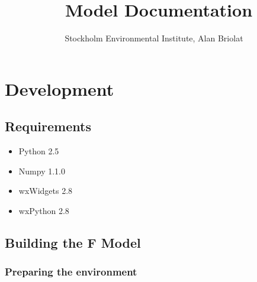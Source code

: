 \documentclass[10pt,a4paper]{article}
\title{\dose\ Model Documentation}
\author{Stockholm Environmental Institute, Alan Briolat}
\date{}
\begin{document}
\maketitle

\section{Development}

\subsection{Requirements}

\begin{itemize}
\item Python 2.5
\item Numpy 1.1.0
\item wxWidgets 2.8
\item wxPython 2.8
\end{itemize}

\subsection{Building the F Model}

\subsubsection*{Preparing the environment}
\end{document}
